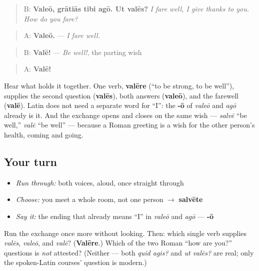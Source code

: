 \begin{quote}
B: \textbf{Valeō, grātiās tibi agō. Ut valēs?} \emph{I fare well, I give thanks to you. How do you fare?}
\end{quote}

\begin{quote}
A: \textbf{Valeō.} — \emph{I fare well.}
\end{quote}

\begin{quote}
B: \textbf{Valē!} — \emph{Be well!}, the parting wish
\end{quote}

\begin{quote}
A: \textbf{Valē!}
\end{quote}

Hear what holds it together. One verb, \textbf{valēre} (\textquotedblleft{}to be strong, to be well\textquotedblright{}), supplies the second question (\textbf{valēs}), both answers (\textbf{valeō}), and the farewell (\textbf{valē}). Latin does not need a separate word for \textquotedblleft{}I\textquotedblright{}: the \textbf{-ō} of \emph{valeō} and \emph{agō} already is it. And the exchange opens and closes on the same wish — \emph{salvē} \textquotedblleft{}be well,\textquotedblright{} \emph{valē} \textquotedblleft{}be well\textquotedblright{} — because a Roman greeting is a wish for the other person's health, coming and going.

\subsection*{Your turn}
\begin{itemize}
\raggedright
  \item \emph{Run through:} both voices, aloud, once straight through
  \item \emph{Choose:} you meet a whole room, not one person $\to$ \textbf{salvēte}
  \item \emph{Say it:} the ending that already means \textquotedblleft{}I\textquotedblright{} in \emph{valeō} and \emph{agō} — \textbf{-ō}
\end{itemize}

\begin{tcolorbox}[breakable,colback=teal!4,colframe=teal!35!black,title={Before you move on}]
Run the exchange once more without looking. Then: which single verb supplies \emph{valēs}, \emph{valeō}, and \emph{valē}? (\textbf{Valēre}.) Which of the two Roman \textquotedblleft{}how are you?\textquotedblright{} questions is \emph{not} attested? (Neither — both \emph{quid agis?} and \emph{ut valēs?} are real; only the spoken-Latin courses' question is modern.)
\end{tcolorbox}
